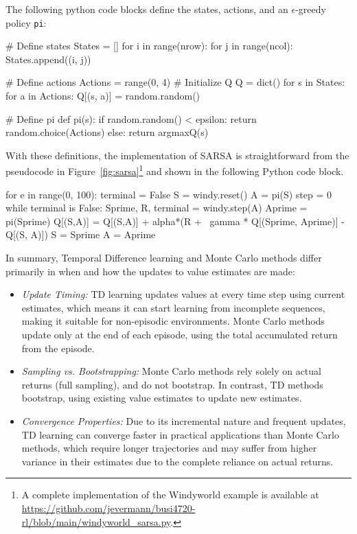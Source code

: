 The following python code blocks define the states, actions, and an $\epsilon$-greedy policy \texttt{pi}:

\begin{samepage}
\begin{pythoncode}
# Define states
States = []
for i in range(nrow):
    for j in range(ncol):
        States.append((i, j))

# Define actions
Actions = range(0, 4)
# Initialize Q
Q = dict()
for s in States:
    for a in Actions:
        Q[(s, a)] = random.random()

# Define pi
def pi(s):
    if random.random() < epsilon:
        return random.choice(Actions)
    else:
        return argmaxQ(s)
\end{pythoncode}
\end{samepage}

With these definitions, the implementation of SARSA is straightforward from the pseudocode in Figure~\ref{fig:sarsa}\footnote{A complete implementation of the Windyworld example is available at \url{https://github.com/jevermann/busi4720-rl/blob/main/windyworld_sarsa.py}.} and shown in the following Python code block.

\begin{samepage}
\begin{pythoncode}
for e in range(0, 100):
    terminal = False
    S = windy.reset()
    A = pi(S)
    step = 0
    while terminal is False:
        Sprime, R, terminal = windy.step(A)
        Aprime = pi(Sprime)
        Q[(S,A)] = Q[(S,A)] + alpha*(R + \
            gamma * Q[(Sprime, Aprime)] - Q[(S, A)])
        S = Sprime
        A = Aprime
\end{pythoncode}
\end{samepage}

In summary, Temporal Difference learning and Monte Carlo methods differ primarily in when and how the updates to value estimates are made:
\begin{itemize}
\item \emph{Update Timing:} TD learning updates values at every time step using current estimates, which means it can start learning from incomplete sequences, making it suitable for non-episodic environments. Monte Carlo methods update only at the end of each episode, using the total accumulated return from the episode.
\item \emph{Sampling vs. Bootstrapping:} Monte Carlo methods rely solely on actual returns (full sampling), and do not bootstrap. In contrast, TD methods bootstrap, using existing value estimates to update new estimates.
\item \emph{Convergence Properties:} Due to its incremental nature and frequent updates, TD learning can converge faster in practical applications than Monte Carlo methods, which require longer trajectories and may suffer from higher variance in their estimates due to the complete reliance on actual returns.
\end{itemize}

